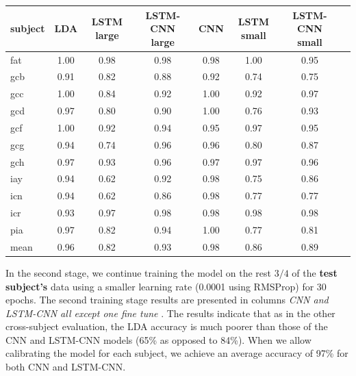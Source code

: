 \documentclass[
12pt, %
english, %
doublespacing, %
headsepline, %
]{MastersDoctoralThesis} %
\begin{document}
\begin{table}
	\centering
	\label{table:AccuracyPerSubject}	
	\begin{tabular}{l|ccccccc}
		\toprule
		{subject} &   LDA &   LSTM large &  LSTM-CNN large &   CNN &  LSTM small& LSTM-CNN small \\
		\midrule
		fat     &  1.00 &  0.98 &      0.98 &  0.98 &        1.00 &            0.95 \\
		gcb     &  0.91 &  0.82 &      0.88 &  0.92 &        0.74 &            0.75 \\
		gcc     &  1.00 &  0.84 &      0.92 &  1.00 &        0.92 &            0.97 \\
		gcd     &  0.97 &  0.80 &      0.90 &  1.00 &        0.76 &            0.93 \\
		gcf     &  1.00 &  0.92 &      0.94 &  0.95 &        0.97 &            0.95 \\
		gcg     &  0.94 &  0.74 &      0.96 &  0.96 &        0.80 &            0.87 \\
		gch     &  0.97 &  0.93 &      0.96 &  0.97 &        0.97 &            0.96 \\
		iay     &  0.94 &  0.62 &      0.92 &  0.98 &        0.75 &            0.86 \\
		icn     &  0.94 &  0.62 &      0.86 &  0.98 &        0.77 &            0.77 \\
		icr     &  0.93 &  0.97 &      0.98 &  0.98 &        0.98 &            0.98 \\
		pia     &  0.97 &  0.82 &      0.94 &  1.00 &        0.77 &            0.81 \\
		mean    &  0.96 &  0.82 &      0.93 &  0.98 &        0.86 &            0.89 \\
		\bottomrule
	\end{tabular}
	
\end{table}

In the second stage, we continue training the model on the rest $3/4$ of the \textbf{test subject's} data using a smaller learning rate (0.0001 using RMSProp) for 30 epochs. The second training stage results are presented in columns \textit{CNN and LSTM-CNN all except one fine tune }. The results indicate that as in the other cross-subject evaluation, the LDA accuracy is much poorer than those of the CNN and LSTM-CNN models (65\% as opposed to 84\%). When we allow calibrating the model for each subject, we achieve an average accuracy of 97\% for both CNN and LSTM-CNN.
\end{document}
